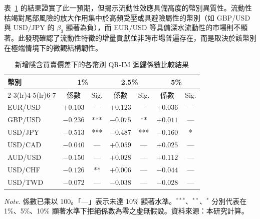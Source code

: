 表~\ref{tab:r5_coef} 的結果證實了此一預期，但揭示流動性效應具備高度的幣別異質性。流動性枯竭對尾部風險的放大作用集中於高頻受壓或具避險屬性的幣別（如 GBP/USD 與 USD/JPY 的 $\beta_3$ 顯著為負），而 EUR/USD 等具備深水流動性的市場則不顯著。此發現確認了流動性特徵的增量貢獻並非跨市場普遍存在，而是取決於該幣別在極端情境下的微觀結構韌性。

\begin{table}[htbp]
    \centering
    \linespread{1.2}\selectfont
    \renewcommand{\arraystretch}{1.2}
    \fontsize{11pt}{15pt}\selectfont
    \vspace{3mm}
    \caption{新增隱含買賣價差下的各幣別 QR-IM 迴歸係數比較結果}
    \label{tab:r5_coef}
    \begin{tabular}{lcccccc}
        \hline
        \textbf{幣別}
        & \multicolumn{2}{c}{\textbf{1\%}}
        & \multicolumn{2}{c}{\textbf{2.5\%}}
        & \multicolumn{2}{c}{\textbf{5\%}} \\
        \cmidrule(lr){2-3}\cmidrule(lr){4-5}\cmidrule(lr){6-7}
        & 係數 & Sig. & 係數 & Sig. & 係數 & Sig. \\
        \hline
        EUR/USD & $+0.103$ & —   & $+0.123$ & —   & $+0.036$ & —   \\
        GBP/USD & $-0.236$ & *** & $-0.075$ & **  & $+0.011$ & —   \\
        USD/JPY & $-0.513$ & *** & $-0.487$ & *** & $-0.160$ & *   \\
        USD/CAD & $-0.040$ & —   & $+0.059$ & —   & $+0.025$ & —   \\
        AUD/USD & $-0.150$ & —   & $+0.028$ & —   & $+0.112$ & —   \\
        USD/CHF & $-0.126$ & **  & $+0.006$ & —   & $-0.044$ & —   \\
        USD/TWD & $-0.072$ & —   & $-0.038$ & —   & $-0.028$ & —   \\
        \hline
    \end{tabular}
    
    \vspace{3mm}
    
    \begin{minipage}{0.77\textwidth}
        \fontsize{9pt}{13pt}\selectfont
        \textit{Note.} 係數已乘以 100。「—」表示未達 10\% 顯著水準。$^{***}$、$^{**}$、$^{*}$ 分別代表在 1\%、5\%、10\% 顯著水準下拒絕係數為零之虛無假設。資料來源：本研究計算。
    \end{minipage}
\end{table}

